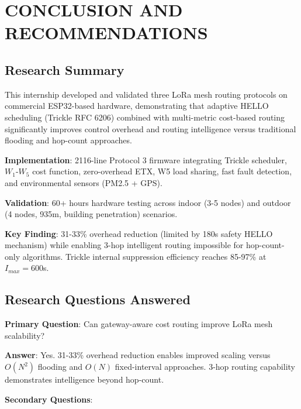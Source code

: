 \setlength{\parindent}{0in}
\setlength{\parskip}{0mm}
\setlength{\baselineskip}{1.6em}

\chapter{CONCLUSION AND RECOMMENDATIONS}
\label{chap:conclusion}

\section{Research Summary}

This internship developed and validated three LoRa mesh routing protocols on commercial ESP32-based hardware, demonstrating that adaptive HELLO scheduling (Trickle RFC 6206) combined with multi-metric cost-based routing significantly improves control overhead and routing intelligence versus traditional flooding and hop-count approaches.

\textbf{Implementation}: 2116-line Protocol 3 firmware integrating Trickle scheduler, $W_1$-$W_5$ cost function, zero-overhead ETX, W5 load sharing, fast fault detection, and environmental sensors (PM2.5 + GPS).

\textbf{Validation}: 60+ hours hardware testing across indoor (3-5 nodes) and outdoor (4 nodes, 935m, building penetration) scenarios.

\textbf{Key Finding}: 31-33\% overhead reduction (limited by 180s safety HELLO mechanism) while enabling 3-hop intelligent routing impossible for hop-count-only algorithms. Trickle internal suppression efficiency reaches 85-97\% at $I_{max}=600$s.

\section{Research Questions Answered}

\textbf{Primary Question}: Can gateway-aware cost routing improve LoRa mesh scalability?

\textbf{Answer}: Yes. 31-33\% overhead reduction enables improved scaling versus $O(N^2)$ flooding and $O(N)$ fixed-interval approaches. 3-hop routing capability demonstrates intelligence beyond hop-count.

\textbf{Secondary Questions}:

